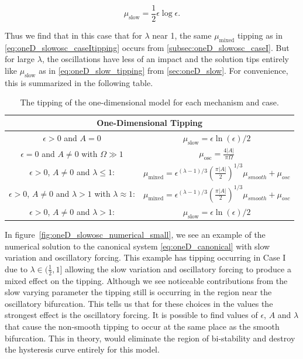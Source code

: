\begin{equation*}
\mu_{\text{slow}}=\frac{1}{2}\epsilon\log\epsilon.
\end{equation*}

Thus we find that in this case that for $\lambda$ near 1, the same $\mu_{\text{mixed}}$ tipping as in \eqref{eq:oneD_slowosc_caseItipping} occurs from \autoref{subsec:oneD_slowosc_caseI}. But for large $\lambda$, the oscillations have less of an impact and the solution tips entirely like $\mu_{\text{slow}}$ as in \eqref{eq:oneD_slow_tipping} from \autoref{sec:oneD_slow}. For convenience, this is summarized in the following table.

\begin{table}[H]\label{table:oneD_tipping}
\centering
\begin{tabular}{|c|c|}
\hline 
 \multicolumn{2}{|c|}{One-Dimensional Tipping} \\ 
\hline
$\epsilon>0$ and $A=0$ & $\mu_{\text{slow}}=\epsilon\ln(\epsilon)/2$ \\ 
\hline 
$\epsilon=0$ and $A\not=0$ with $\Omega\gg1$ & $\mu_{\text{osc}}=\frac{4|A|}{\pi \Omega}$\\ 
\hline 
$\epsilon>0$, $A\not=0$ and $\lambda\le 1$: & $\mu_{\text{mixed}}=\epsilon^{(\lambda-1)/3}\left(\frac{\pi |A|}{2}\right)^{1/3} \mu_{smooth}+\mu_{osc}$ \\ 
\hline 
$\epsilon>0$, $A\not=0$ and $\lambda> 1$ with $\lambda\approx 1$: & $\mu_{\text{mixed}}=\epsilon^{(\lambda-1)/3}\left(\frac{\pi |A|}{2}\right)^{1/3} \mu_{smooth}+\mu_{osc}$ \\
\hline
$\epsilon>0$, $A\not=0$ and $\lambda>1$: & $ \mu_{\text{slow}}=\epsilon\ln(\epsilon)/2$\\
\hline
\end{tabular} 
\caption{The tipping of the one-dimensional model for each mechanism and case.}
\end{table}

In figure~\ref{fig:oneD_slowosc_numerical_small}, we see an example of the numerical solution to the canonical system \eqref{eq:oneD_canonical} with slow variation and oscillatory forcing. This example has tipping occurring in Case I due to $\lambda\in (\frac{1}{2},1]$ allowing the slow variation and oscillatory forcing to produce a mixed effect on the tipping. Although we see noticeable contributions from the slow varying parameter the tipping still is occurring in the region near the oscillatory bifurcation. This tells us that for these choices in the values the strongest effect is the oscillatory forcing. It is possible to find values of $\epsilon$, $A$ and $\lambda$ that cause the non-smooth tipping to occur at the same place as the smooth bifurcation. This in theory, would eliminate the region of bi-stability and destroy the hysteresis curve entirely for this model.

